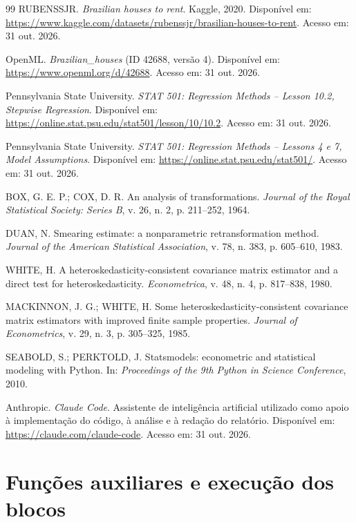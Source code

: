 \documentclass[12pt,a4paper]{article}
\begin{document}
\begin{thebibliography}{99}
RUBENSSJR. \textit{Brazilian houses to rent}. Kaggle, 2020. Disponível em: \url{https://www.kaggle.com/datasets/rubenssjr/brasilian-houses-to-rent}. Acesso em: 31 out. 2026.

OpenML. \textit{Brazilian\_houses} (ID 42688, versão 4). Disponível em: \url{https://www.openml.org/d/42688}. Acesso em: 31 out. 2026.

Pennsylvania State University. \textit{STAT 501: Regression Methods -- Lesson 10.2, Stepwise Regression}. Disponível em: \url{https://online.stat.psu.edu/stat501/lesson/10/10.2}. Acesso em: 31 out. 2026.

Pennsylvania State University. \textit{STAT 501: Regression Methods -- Lessons 4 e 7, Model Assumptions}. Disponível em: \url{https://online.stat.psu.edu/stat501/}. Acesso em: 31 out. 2026.

BOX, G. E. P.; COX, D. R. An analysis of transformations. \textit{Journal of the Royal Statistical Society: Series B}, v. 26, n. 2, p. 211--252, 1964.

DUAN, N. Smearing estimate: a nonparametric retransformation method. \textit{Journal of the American Statistical Association}, v. 78, n. 383, p. 605--610, 1983.

WHITE, H. A heteroskedasticity-consistent covariance matrix estimator and a direct test for heteroskedasticity. \textit{Econometrica}, v. 48, n. 4, p. 817--838, 1980.

MACKINNON, J. G.; WHITE, H. Some heteroskedasticity-consistent covariance matrix estimators with improved finite sample properties. \textit{Journal of Econometrics}, v. 29, n. 3, p. 305--325, 1985.

SEABOLD, S.; PERKTOLD, J. Statsmodels: econometric and statistical modeling with Python. In: \textit{Proceedings of the 9th Python in Science Conference}, 2010.

Anthropic. \textit{Claude Code}. Assistente de inteligência artificial utilizado como apoio à implementação do código, à análise e à redação do relatório. Disponível em: \url{https://claude.com/claude-code}. Acesso em: 31 out. 2026.
\end{thebibliography}

\appendix
\section{Funções auxiliares e execução dos blocos}
\label{ap:auxiliar}
\end{document}
